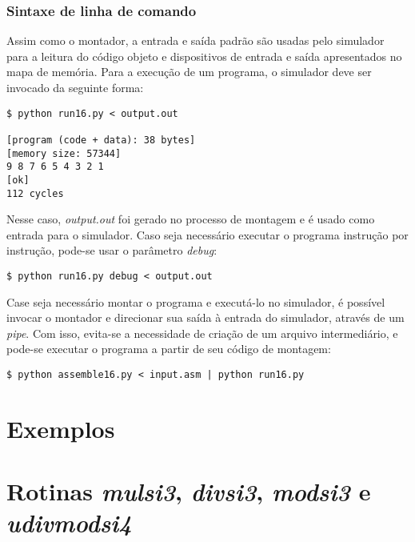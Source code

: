\documentclass{extreport}
\begin{document}
\subsection{Sintaxe de linha de comando}

Assim como o montador, a entrada e saída padrão são usadas pelo simulador para a leitura do código objeto e dispositivos de entrada e saída apresentados no mapa de memória. Para a execução de um programa, o simulador deve ser invocado da seguinte forma:

\begin{verbatim}
$ python run16.py < output.out

[program (code + data): 38 bytes]
[memory size: 57344]
9 8 7 6 5 4 3 2 1
[ok]
112 cycles
\end{verbatim}

Nesse caso, \textit{output.out} foi gerado no processo de montagem e é usado como entrada para o simulador. Caso seja necessário executar o programa instrução por instrução, pode-se usar o parâmetro \textit{debug}:

\begin{verbatim}
$ python run16.py debug < output.out
\end{verbatim}

Case seja necessário montar o programa e executá-lo no simulador, é possível invocar o montador e direcionar sua saída à entrada do simulador, através de um \textit{pipe}. Com isso, evita-se a necessidade de criação de um arquivo intermediário, e pode-se executar o programa a partir de seu código de montagem:

\begin{verbatim}
$ python assemble16.py < input.asm | python run16.py
\end{verbatim}

\appendix

\chapter{Exemplos}







\chapter{Rotinas \textit{mulsi3}, \textit{divsi3}, \textit{modsi3} e \textit{udivmodsi4}}
\label{ref:muldiv}





\end{document}
